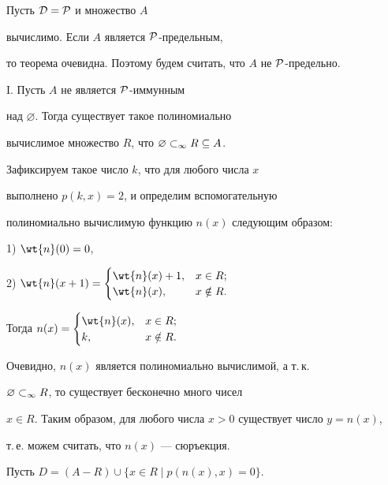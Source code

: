 \begin{pf}


Пусть $\cal{D}=\cal{P}$ и множество $A$


вычислимо. Если $A$ является $\cal{P}$-предельным,


то теорема очевидна. Поэтому будем считать, что $A$ не $\cal{P}$-предельно.





I. Пусть $A$ не является $\cal{P}$-иммунным


над $\varnothing$. Тогда существует такое полиномиально


вычислимое множество $R$, что ${\varnothing}\subset_\infty{R\subseteq A}$.


Зафиксируем такое число $k$, что для любого числа $x$


выполнено $p(k,x)=2$, и определим вспомогательную


полиномиально вычислимую функцию $n(x)$ следующим образом:





1) $\wt{n}(0)=0$,





2) $\wt{n}(x+1)=\begin{cases}


\wt{n}(x)+1,  & x\in R;\\ \wt{n}(x), & x\notin R. \end{cases}$





Тогда $n(x)=\begin{cases} \wt{n}(x), & x\in R; \\


k, & x\notin R.\end{cases}$





\noindent{}Очевидно, $n(x)$ является полиномиально вычислимой, а т.\,к.


${\varnothing}\subset_\infty{R}$, то существует бесконечно много чисел


$x\in R$. Таким образом, для любого числа $x>0$ существует число $y=n(x)$,


т.\,е. можем считать, что $n(x)$ --- сюръекция.





Пусть $D=(A-R)\cup\{x\in R\mid p(n(x),x)=0\}$.



\end{pf}
